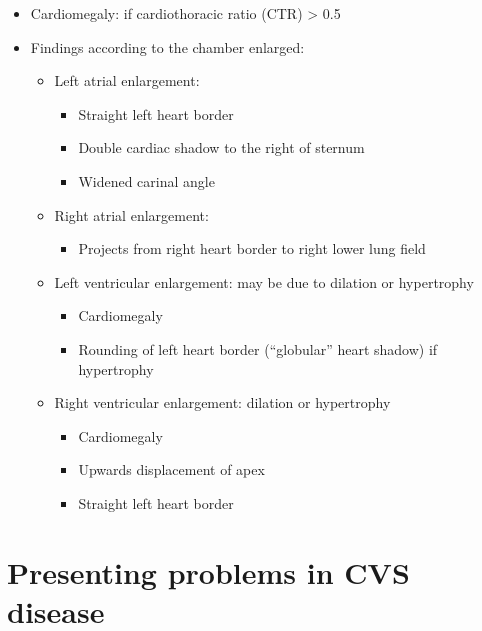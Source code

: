 \documentclass[
  12pt,
]{memoir}
\providecommand{\tightlist}{%
  \setlength{\itemsep}{0pt}\setlength{\parskip}{0pt}}
\begin{document}
\begin{itemize}
\tightlist
\item
  Cardiomegaly: if cardiothoracic ratio (CTR) \textgreater{} 0.5
\item
  Findings according to the chamber enlarged:

  \begin{itemize}
  \tightlist
  \item
    Left atrial enlargement:

    \begin{itemize}
    \tightlist
    \item
      Straight left heart border
    \item
      Double cardiac shadow to the right of sternum
    \item
      Widened carinal angle
    \end{itemize}
  \item
    Right atrial enlargement:

    \begin{itemize}
    \tightlist
    \item
      Projects from right heart border to right lower lung field
    \end{itemize}
  \item
    Left ventricular enlargement: may be due to dilation or hypertrophy

    \begin{itemize}
    \tightlist
    \item
      Cardiomegaly
    \item
      Rounding of left heart border (``globular'' heart shadow) if
      hypertrophy
    \end{itemize}
  \item
    Right ventricular enlargement: dilation or hypertrophy

    \begin{itemize}
    \tightlist
    \item
      Cardiomegaly
    \item
      Upwards displacement of apex
    \item
      Straight left heart border
    \end{itemize}
  \end{itemize}
\end{itemize}

\hypertarget{presenting-problems-in-cvs-disease}{%
\section{Presenting problems in CVS
disease}\label{presenting-problems-in-cvs-disease}}
\end{document}
